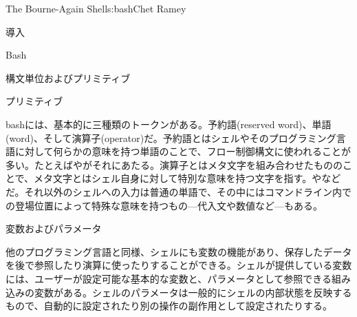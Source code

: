 \begin{aosachapter}{The Bourne-Again Shell}{s:bash}{Chet Ramey}
\begin{aosasect1}{導入}
\begin{aosasect2}{Bash}
\end{aosasect2}

\end{aosasect1}

\begin{aosasect1}{構文単位およびプリミティブ}

\begin{aosasect2}{プリミティブ}

bashには、基本的に三種類のトークンがある。予約語(reserved word)、単語(word)、そして演算子(operator)だ。予約語とはシェルやそのプログラミング言語に対して何らかの意味を持つ単語のことで、フロー制御構文に使われることが多い。たとえばやがそれにあたる。演算子とはメタ文字を組み合わせたもののことで、メタ文字とはシェル自身に対して特別な意味を持つ文字を指す。\code{|}や\code{{\textgreater}}などだ。それ以外のシェルへの入力は普通の単語で、その中にはコマンドライン内での登場位置によって特殊な意味を持つもの---代入文や数値など---もある。

\end{aosasect2}

\begin{aosasect2}{変数およびパラメータ}

他のプログラミング言語と同様、シェルにも変数の機能があり、保存したデータを後で参照したり演算に使ったりすることができる。シェルが提供している変数には、ユーザーが設定可能な基本的な変数と、パラメータとして参照できる組み込みの変数がある。シェルのパラメータは一般的にシェルの内部状態を反映するもので、自動的に設定されたり別の操作の副作用として設定されたりする。


\end{aosasect2}
\end{aosasect1}
\end{aosachapter}
